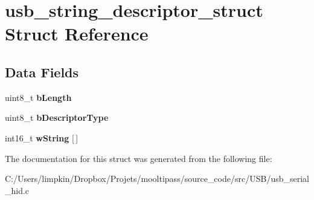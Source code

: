 \hypertarget{structusb__string__descriptor__struct}{\section{usb\+\_\+string\+\_\+descriptor\+\_\+struct Struct Reference}
\label{structusb__string__descriptor__struct}
}
\subsection*{Data Fields}
\begin{DoxyCompactItemize}
\item 
\hypertarget{structusb__string__descriptor__struct_a1deca1f1d6e5815b290e6e1015bce5b8}{uint8\+\_\+t {\bfseries b\+Length}}\label{structusb__string__descriptor__struct_a1deca1f1d6e5815b290e6e1015bce5b8}

\item 
\hypertarget{structusb__string__descriptor__struct_a67d7027b9eb9ed268d28e84fbc675707}{uint8\+\_\+t {\bfseries b\+Descriptor\+Type}}\label{structusb__string__descriptor__struct_a67d7027b9eb9ed268d28e84fbc675707}

\item 
\hypertarget{structusb__string__descriptor__struct_a73b6a1a52dd1abac3cef0d39a6e340a5}{int16\+\_\+t {\bfseries w\+String} \mbox{[}$\,$\mbox{]}}\label{structusb__string__descriptor__struct_a73b6a1a52dd1abac3cef0d39a6e340a5}

\end{DoxyCompactItemize}


The documentation for this struct was generated from the following file\+:\begin{DoxyCompactItemize}
\item 
C\+:/\+Users/limpkin/\+Dropbox/\+Projets/mooltipass/source\+\_\+code/src/\+U\+S\+B/usb\+\_\+serial\+\_\+hid.\+c\end{DoxyCompactItemize}
